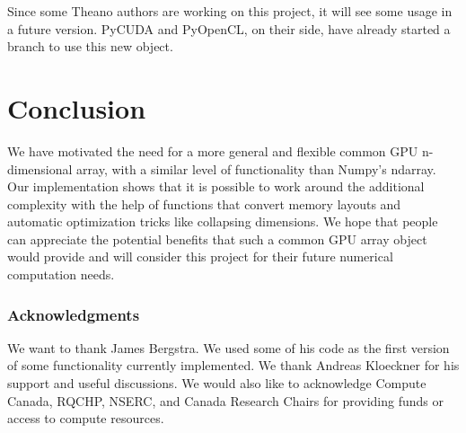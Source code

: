 \documentclass{article} %
\begin{document}
Since some Theano authors are working on this project, it will see some usage in a future version. PyCUDA and PyOpenCL, on their side, have already started a branch to use this new object.

\section{Conclusion}

We have motivated the need for a more general and flexible common GPU n-dimensional array, with a similar level of functionality than Numpy's ndarray.
Our implementation shows that it is possible to work around the additional complexity with the help of functions that convert memory layouts and automatic optimization tricks like collapsing dimensions.
We hope that people can appreciate the potential benefits that such a common GPU array object would provide and will consider this project for their future numerical computation needs.

\subsubsection*{Acknowledgments}

We want to thank James Bergstra. We used some of his code as the first version of some functionality currently implemented. We thank Andreas Kloeckner for his support and useful discussions. We would also like to acknowledge Compute Canada, RQCHP, NSERC, and Canada Research Chairs for providing funds or access to compute resources.




\end{document}
